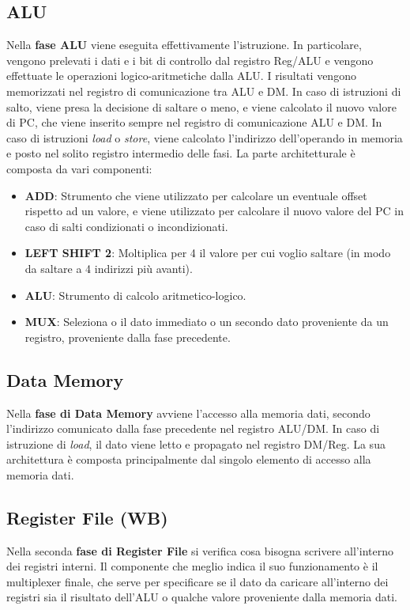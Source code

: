 \subsection{ALU}
Nella \textbf{fase ALU} viene eseguita effettivamente l'istruzione. In particolare, vengono prelevati i dati e i bit di controllo dal registro Reg/ALU e vengono effettuate le operazioni logico-aritmetiche dalla ALU. I risultati vengono memorizzati nel registro di comunicazione tra ALU e DM. In caso di istruzioni di salto, viene presa la decisione di saltare o meno, e viene calcolato il nuovo valore di PC, che viene inserito sempre nel registro di comunicazione ALU e DM. In caso di istruzioni \textit{load} o \textit{store}, viene calcolato l'indirizzo dell'operando in memoria e posto nel solito registro intermedio delle fasi. 
La parte architetturale è composta da vari componenti:
\begin{itemize}
    \item \textbf{ADD}: Strumento che viene utilizzato per calcolare un eventuale offset rispetto ad un valore, e viene utilizzato per calcolare il nuovo valore del PC in caso di salti condizionati o incondizionati.
    \item \textbf{LEFT SHIFT 2}: Moltiplica per 4 il valore per cui voglio saltare (in modo da saltare a 4 indirizzi più avanti).
    \item \textbf{ALU}: Strumento di calcolo aritmetico-logico.
    \item \textbf{MUX}: Seleziona o il dato immediato o un secondo dato proveniente da un registro, proveniente dalla fase precedente.
\end{itemize}

\subsection{Data Memory}
Nella \textbf{fase di Data Memory} avviene l'accesso alla memoria dati, secondo l'indirizzo comunicato dalla fase precedente nel registro ALU/DM. In caso di istruzione di \textit{load}, il dato viene letto e propagato nel registro DM/Reg. La sua architettura è composta principalmente dal singolo elemento di accesso alla memoria dati.

\subsection{Register File (WB)}
Nella seconda \textbf{fase di Register File} si verifica cosa bisogna scrivere all'interno dei registri interni. Il componente che meglio indica il suo funzionamento è il multiplexer finale, che serve per specificare se il dato da caricare all'interno dei registri sia il risultato dell'ALU o qualche valore proveniente dalla memoria dati. 

